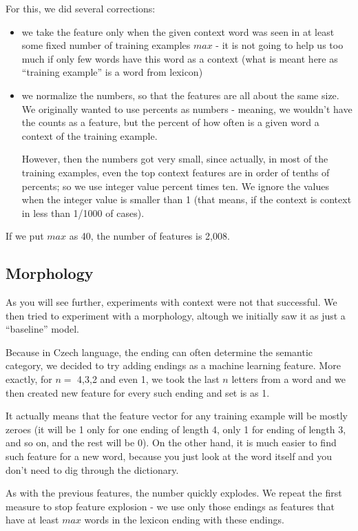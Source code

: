 \documentclass[letterpaper]{article}
\begin{document}
For this, we did several corrections:
\begin{itemize}
    \item we take the feature only when the given context word was seen in at least some 
fixed number of training examples $max$ - it is not going to help us too much 
if only few words have this word as a context (what is meant here 
as ``training example'' is a word from lexicon)
    
    \item we normalize the numbers, so that the features are all about 
the same size. We originally wanted to use percents as numbers - meaning, 
we wouldn't have the counts as a feature, but the percent of how often is a given word a context of the training example.
    
     However, then the numbers got very small, since actually, 
in most of the training examples, even the top context features are in order of 
tenths of percents; so we use integer value percent times ten. 
We ignore the values when the integer value is smaller than 1 (that means, if the context is context in less than 1/1000 of cases).
     

\end{itemize}

If we put $max$ as 40, the number of features is 2,008.

\subsection{Morphology}
As you will see further, experiments with context were not that successful. 
We then tried to experiment with a morphology, altough we initially saw it as just a ``baseline'' model.

Because in Czech language, the ending can often determine the semantic category, 
we decided to try adding endings as a machine learning feature. 
More exactly, for $n=$ 4,3,2 and even 1, we took the last $n$ letters from 
a word and we then created new feature for every such ending and set is as 1.

It actually means that the feature vector for any training example will be mostly zeroes 
(it will be 1 only for one ending of length 4, only 1 for ending of length 3, and so on, 
and the rest will be 0). On the other hand, it is much easier to find such feature 
for a new word, because you just look at the word itself and you don't need to dig through the dictionary.

As with the previous features, the number quickly explodes. We repeat the first measure 
to stop feature explosion - we use only those endings as features that have at least $max$ words in the lexicon ending with these endings.
\end{document}
